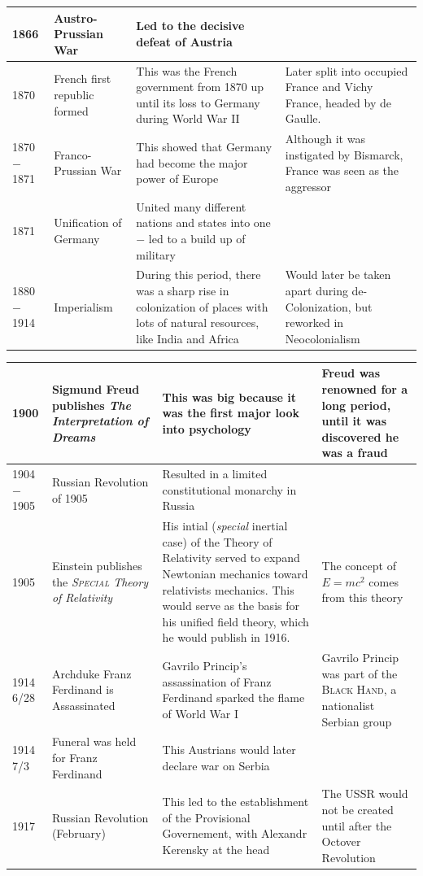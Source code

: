 \documentclass[12pt]{article}
\begin{document}
\begin{enumerate}
\begin{tabular}{|p{}|p{}|p{}|p{}|}
\hline
1866 & Austro-Prussian War  & Led to the decisive defeat of Austria  & \\
\hline
1870 & French first republic formed  & This was the French government from 1870 up until its loss to Germany during World War II  & Later split into occupied France and Vichy France, headed by de Gaulle.  \\
\hline
1870$-$1871 & Franco-Prussian War  & This showed that Germany had become the major power of Europe  & Although it was instigated by Bismarck, France was seen as the aggressor  \\
\hline
1871 & Unification of Germany  & United many different nations and states into one $-$ led to a build up of military  &    \\
\hline
1880$-$1914 & Imperialism  & During this period, there was a sharp rise in colonization of places with lots of natural resources, like India and Africa  & Would later be taken apart during de-Colonization, but reworked in Neocolonialism  \\
\hline
\end{tabular}
\newpage
\hspace{-25pt}\begin{tabular}{|p{}|p{}|p{}|p{}|}
\hline
1900 & Sigmund Freud publishes \textit{The Interpretation of Dreams}  & This was big because it was the first major look into psychology  & Freud was renowned for a long period, until it was discovered he was a fraud  \\
\hline
1904$-$1905 & Russian Revolution of 1905 & Resulted in a limited constitutional monarchy in Russia  &  \\
\hline
    1905 & Einstein publishes the \textit{\textsc{Special} Theory of Relativity} & His intial (\textit{special} inertial case) of the Theory of Relativity served to expand Newtonian mechanics toward relativists mechanics. This would serve as the basis for his unified field theory, which he would publish in 1916. &  The concept of $E=mc^2$ comes from this theory \\
\hline
    1914 6/28 & Archduke Franz Ferdinand is Assassinated  & Gavrilo Princip's assassination of Franz Ferdinand sparked the flame of World War I  & Gavrilo Princip was part of the \textsc{Black Hand}, a nationalist Serbian group \\
\hline
1914 7/3 & Funeral was held for Franz Ferdinand  & This Austrians would later declare war on Serbia  & \\
\hline
1917 & Russian Revolution (February)  & This led to the establishment of the Provisional Governement, with Alexandr Kerensky at the head  & The USSR would not be created until after the Octover Revolution \\

\end{tabular}
\end{enumerate}
\end{document}
